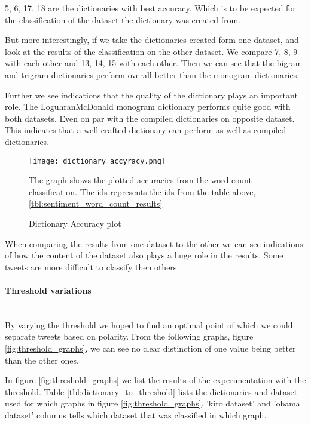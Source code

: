 5, 6, 17, 18 are the dictionaries with best accuracy. Which is to be expected
for the classification of the dataset the dictionary was created from. 

But more interestingly, if we take the dictionaries created form one dataset,
and look at the results of the classification on the other dataset. We compare
7, 8, 9 with each other and 13, 14, 15 with each other. Then we can see that
the bigram and trigram dictionaries perform overall better than the monogram
dictionaries. 

Further we see indications that the quality of the dictionary plays an
important role. The LoguhranMcDonald monogram dictionary performs quite good
with both datasets. Even on par with the compiled dictionaries on opposite
dataset. This indicates that a well crafted dictionary can perform as well
as compiled dictionaries.  

\begin{figure}[htb]
    \centering
    \texttt{[image: dictionary\_accyracy.png]} 
    \label{fig:dictionary_accyracy}
    \caption{Dictionary Accuracy plot}
The graph shows the plotted accuracies from the word count
classification. The ids represents the ids from the table above, \ref{tbl:sentiment_word_count_results}
\end{figure}
 
When comparing the results from one dataset to the other we can see indications
of how the content of the dataset also plays a huge role in the results. Some
tweets are more difficult to classify then others. 
%

\paragraph{Threshold variations}
\hspace{0pt}\\
By varying the threshold we hoped to find an optimal point of which we could
separate tweets based on polarity. From the following
graphs, figure \ref{fig:threshold_graphs}, we can see no clear distinction of
one value being better than the other ones.  

In figure \ref{fig:threshold_graphs} we list the results of the experimentation
with the threshold. Table \ref{tbl:dictionary_to_threshold} lists the
dictionaries and dataset used for which graphs in figure \ref{fig:threshold_graphs}.
'kiro dataset' and 'obama dataset' columns tells which dataset that was
classified in which graph.

